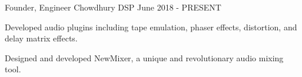 

\begin{cventries}


    \cventry
    {Founder, Engineer} %
    {Chowdhury DSP} %
    {} %
    {June 2018 - PRESENT} %
    {
      \begin{cvitems} %
        \item {Developed audio plugins including tape emulation, phaser effects,
              distortion, and delay matrix effects.}
        \item {Designed and developed NewMixer, a unique and revolutionary
               audio mixing tool.}
      \end{cvitems}
    }


\end{cventries}
